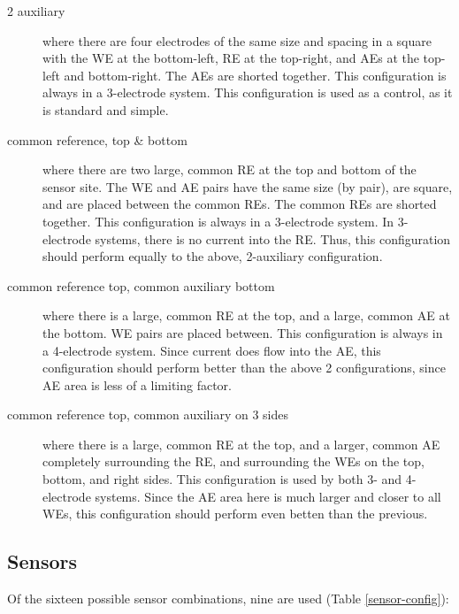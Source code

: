 \begin{description}
\item[2 auxiliary] where there are four electrodes of the same size and spacing in a square with the WE at the bottom-left, RE at the top-right, and AEs at the top-left and bottom-right. The AEs are shorted together. This configuration is always in a 3-electrode system. This configuration is used as a control, as it is standard and simple.
\item[common reference, top \& bottom] where there are two large, common RE at the top and bottom of the sensor site. The WE and AE pairs have the same size (by pair), are square, and are placed between the common REs. The common REs are shorted together. This configuration is always in a 3-electrode system. In 3-electrode systems, there is no current into the RE. Thus, this configuration should perform equally to the above, 2-auxiliary configuration.
\item[common reference top, common auxiliary bottom] where there is a large, common RE at the top, and a large, common AE at the bottom. WE pairs are placed between. This configuration is always in a 4-electrode system. Since current does flow into the AE, this configuration should perform better than the above 2 configurations, since AE area is less of a limiting factor.
\item[common reference top, common auxiliary on 3 sides] where there is a large, common RE at the top, and a larger, common AE completely surrounding the RE, and surrounding the WEs on the top, bottom, and right sides. This configuration is used by both 3- and 4-electrode systems. Since the AE area here is much larger and closer to all WEs, this configuration should perform even betten than the previous.
\end{description}

\subsection{Sensors}

Of the sixteen possible sensor combinations, nine are used (Table \ref{sensor-config}):

